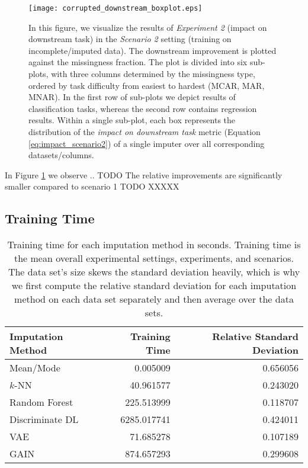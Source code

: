\begin{figure}\centering
	\texttt{[image: corrupted\_downstream\_boxplot.eps]}

	\caption[Downstream Ranks - Corrupted]{In this figure, we visualize the results of \textit{Experiment 2} (impact on downstream task) in the \textit{Scenario 2} setting (training on incomplete/imputed data). The downstream improvement is plotted against the missingness fraction. The plot is divided into six sub-plots, with three columns determined by the missingness type, ordered by task difficulty from easiest to hardest (MCAR, MAR, MNAR). In the first row of sub-plots we depict results of classification tasks, whereas the second row contains regression results. Within a single sub-plot, each box represents the distribution of the \textit{impact on downstream task} metric (Equation \ref{eq:impact_scenario2}) of a single imputer over all corresponding datasets/columns.
    }
	\label{fig:corrupted_downstream_boxplot}
\end{figure}

In Figure \ref{fig:corrupted_downstream_boxplot} we observe .. TODO
The relative improvements are significantly smaller compared to scenario 1
TODO XXXXX




\subsection{Training Time}

\begin{table}
	\centering
	\begin{tabular}{lrr}
		\toprule
		Imputation Method &  Training Time &  Relative Standard Deviation \\
		\midrule
		Mean/Mode &       0.005009 &                     0.656056 \\
		$k$-NN &      40.961577 &                     0.243020 \\
		Random Forest &     225.513999 &                     0.118707 \\
		Discriminate DL &    6285.017741 &                     0.424011 \\
		VAE &      71.685278 &                     0.107189 \\
		GAIN &     874.657293 &                     0.299608 \\
		\bottomrule
	\end{tabular}
	\caption{Training time for each imputation method in seconds. Training time is the mean overall experimental settings, experiments, and scenarios. The data set's size skews the standard deviation heavily, which is why we first compute the relative standard deviation for each imputation method on each data set separately and then average over the data sets.}
	\label{tab:training_time}
\end{table}
